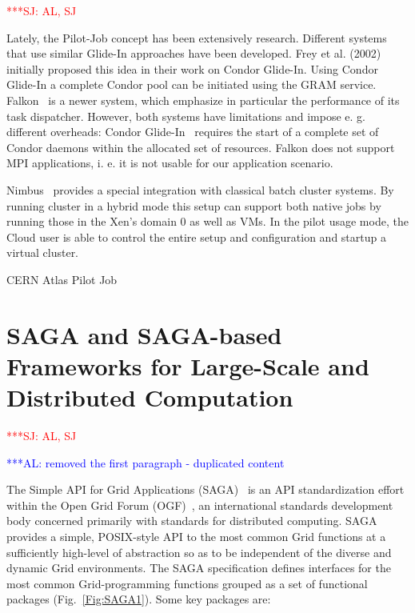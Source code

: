 \documentclass[conference,final]{IEEEtran}
\newcommand{\alnote}[1]{ {\textcolor{blue} { ***AL: #1 }}}
\newcommand{\jhanote}[1]{ {\textcolor{red} { ***SJ: #1 }}}
\newcommand{\alnote}[1]{}
\newcommand{\jhanote}[1]{}
\begin{document}
 \jhanote{AL, SJ}

Lately, the Pilot-Job concept has been extensively research.
Different systems that use similar Glide-In approaches have been
developed. Frey et al. (2002) initially proposed this idea in their
work on Condor Glide-In. Using Condor Glide-In a complete Condor pool
can be initiated using the GRAM service. Falkon~\cite{1362680} is a
newer system, which emphasize in particular the performance of its
task dispatcher. However, both systems have limitations and impose
e. g. different overheads: Condor Glide-In~\cite{citeulike:291860}
requires the start of a complete set of Condor daemons within the
allocated set of resources. Falkon does not support MPI applications,
i. e. it is not usable for our application scenario.

Nimbus~\cite{10.1109/MIC.2009.94} provides a special integration with
classical batch cluster systems. By running cluster in a hybrid mode
this setup can support both native jobs by running those in the Xen's
domain 0 as well as VMs. In the pilot usage mode, the Cloud user is
able to control the entire setup and configuration and startup a
virtual cluster.

CERN Atlas Pilot Job~\cite{1555338}

\section{SAGA and SAGA-based Frameworks for Large-Scale and
  Distributed Computation} \jhanote{AL, SJ}

\alnote{removed the first paragraph - duplicated content}

The Simple API for Grid Applications (SAGA)~\cite{saga_url}  is an API standardization
effort within the Open Grid Forum (OGF)~\cite{saga_gfd90}, an
international standards development body concerned primarily with
standards for distributed computing. SAGA provides a simple,
POSIX-style API to the most common Grid functions at a sufficiently
high-level of abstraction so as to be independent of the diverse and
dynamic Grid environments. The SAGA specification defines interfaces
for the most common Grid-programming functions grouped as a set of
functional packages (Fig.~\ref{Fig:SAGA1}). Some key packages are:
\end{document}
